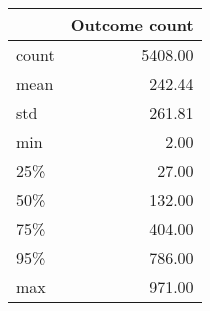 \begin{tabular}{lr}
\toprule
{} &  Outcome count \\
\midrule
count &        5408.00 \\
mean  &         242.44 \\
std   &         261.81 \\
min   &           2.00 \\
25\%   &          27.00 \\
50\%   &         132.00 \\
75\%   &         404.00 \\
95\%   &         786.00 \\
max   &         971.00 \\
\bottomrule
\end{tabular}
